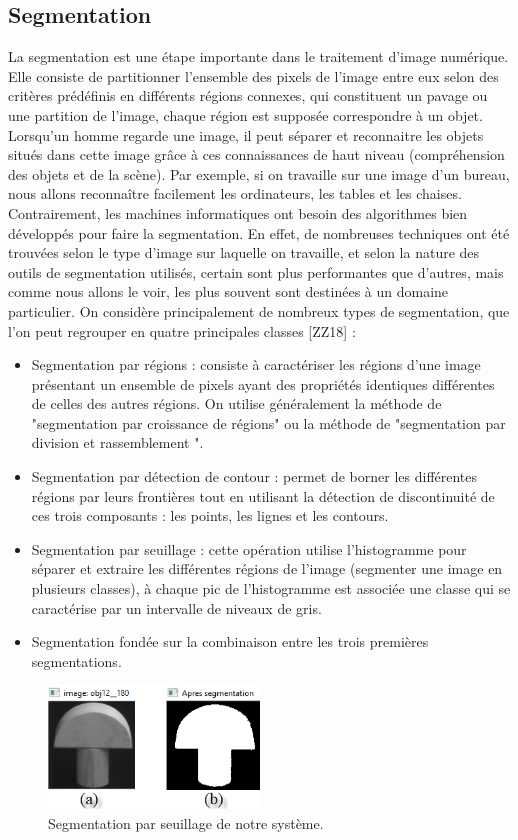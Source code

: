 \subsection{Segmentation}
La segmentation est une étape importante dans le traitement d'image numérique.
Elle consiste de partitionner l’ensemble des pixels de l'image entre eux selon des critères prédéfinis en différents régions connexes, qui constituent un pavage ou une partition de l'image, chaque région est supposée correspondre à un objet.
Lorsqu’un homme regarde une image, il peut séparer et reconnaitre les
objets situés dans cette image grâce à ces connaissances de haut niveau
(compréhension des objets et de la scène). Par exemple, si on travaille sur
une image d’un bureau, nous allons reconnaître facilement les ordinateurs,
les tables et les chaises. Contrairement, les machines informatiques ont
besoin des algorithmes bien développés pour faire la segmentation.
En effet, de nombreuses techniques ont été trouvées selon le type d’image
sur laquelle on travaille, et selon la nature des outils de segmentation
utilisés, certain sont plus performantes que d’autres, mais comme nous
allons le voir, les plus souvent sont destinées à un domaine particulier.
On considère principalement de nombreux types de segmentation, que l'on
peut regrouper en quatre principales classes [ZZ18] :
\begin{itemize}
	\item Segmentation par régions : consiste à caractériser les régions d’une image
	présentant un ensemble de pixels ayant des propriétés identiques
	différentes de celles des autres régions. On utilise généralement la
	méthode de "segmentation par croissance de régions" ou la méthode de
	"segmentation par division et rassemblement ".
	\item Segmentation par détection de contour : permet de borner les différentes
	régions par leurs frontières tout en utilisant la détection de discontinuité
	de ces trois composants : les points, les lignes et les contours.
	\item Segmentation par seuillage : cette opération utilise l’histogramme pour
	séparer et extraire les différentes régions de l’image (segmenter une image
	en plusieurs classes), à chaque pic de l’histogramme est associée une
	classe qui se caractérise par un intervalle de niveaux de gris.
	\item Segmentation fondée sur la combinaison entre les trois premières
	segmentations.
\end{itemize}
\begin{figure}[H]
	\centering
	\includegraphics[width=0.5\textwidth]{Figures/segmentation.png} 
	\caption{Segmentation par seuillage de notre système.}
\end{figure}
